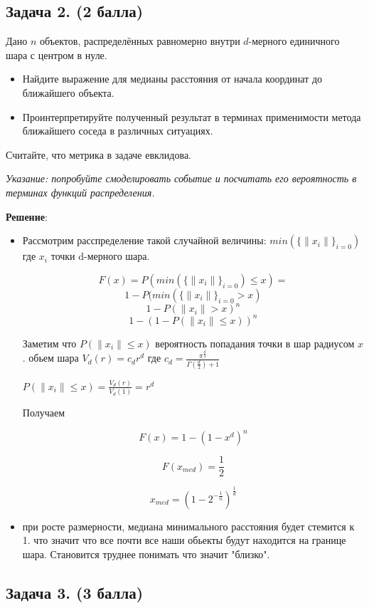 \documentclass{article}
\begin{document}
\subsection*{Задача 2. (2 балла)}

    Дано $n$ объектов, распределённых равномерно внутри $d$-мерного единичного шара с центром в нуле.
    \begin{itemize}
        \item Найдите выражение для медианы расстояния от начала координат до ближайшего объекта.
        \item Проинтерпретируйте полученный результат в терминах применимости метода ближайшего соседа в различных ситуациях.
    \end{itemize}
    
    \noindent
    Считайте, что метрика в задаче евклидова.
    
    \noindent
    \emph{Указание: попробуйте смоделировать событие и посчитать его вероятность в терминах функций распределения.}

\noindent
\textbf{Решение}:
    \begin{itemize}
        \item Рассмотрим расспределение такой случайной величины: $min( \{ \| x_i \| \}_{i=0} )$ где $x_i$ точки d-мерного шара.

$$ F(x) = P(min( \{ \| x_i \| \}_{i=0} ) \leq x) = $$
$$ 1 - P(min(\{ \| x_i \| \}_{i=0} > x) $$
$$ 1 - P( \| x_i \| > x)^n $$
$$ 1 - (1 - P( \| x_i \| \leq x))^n $$

Заметим что $P( \| x_i \| \leq x)$ вероятность попадания точки в шар радиусом $x$. обьем шара $V_d(r) = c_d r^d$ где $c_d = \frac{\pi^\frac{d}{2}}{\Gamma(\frac{d}{2}) + 1}$

$P( \| x_i \| \leq x) = \frac{V_d(r)}{V_d(1)} = r^d$

Получаем

$$F(x) = 1- (1 - x^d)^n$$

$$F(x_{med}) = \frac{1}{2}$$

$$x_{med} = (1 - 2^{-\frac{1}{n}})^{\frac{1}{d}}$$
        \item при росте размерности, медиана минимального расстояния будет стемится к 1. что значит что все почти все наши обьекты будут находится на границе шара. Становится труднее понимать что значит "близко".

        
    \end{itemize}


\subsection*{Задача 3. (3 балла)}
\end{document}
